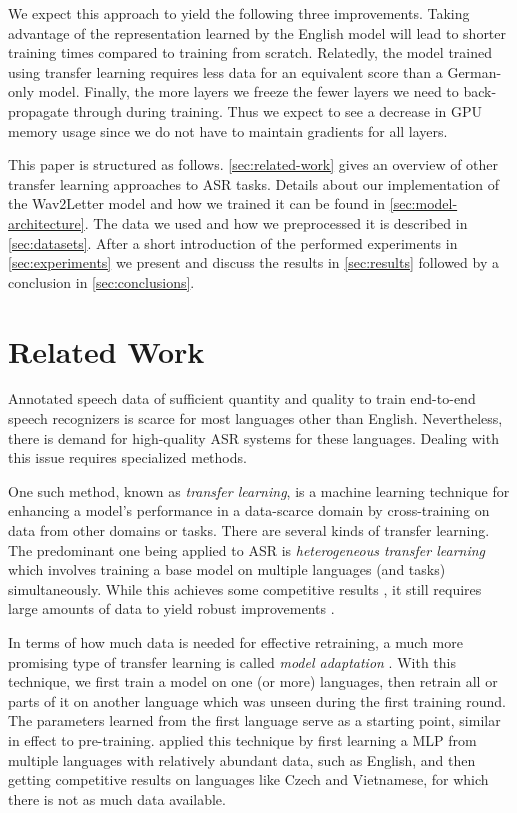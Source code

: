 \documentclass[11pt,a4paper]{article}
\begin{document}
We expect this approach to yield the following three improvements.
Taking advantage of the representation learned by the English model will lead to shorter training times compared to training from scratch.
Relatedly, the model trained using transfer learning requires less data for an equivalent score than a German-only model.
Finally, the more layers we freeze the fewer layers we need to back-propagate through during training.
Thus we expect to see a decrease in GPU memory usage since we do not have to maintain gradients for all layers.

This paper is structured as follows.
\autoref{sec:related-work} gives an overview of other transfer learning approaches to \ac{ASR} tasks.
Details about our implementation of the Wav2Letter model and how we trained it can be found in \autoref{sec:model-architecture}.
The data we used and how we preprocessed it is described in \autoref{sec:datasets}.
After a short introduction of the performed experiments in \autoref{sec:experiments} we present and discuss the results in \autoref{sec:results} followed by a conclusion in \autoref{sec:conclusions}.



\section{Related Work}\label{sec:related-work}

Annotated speech data of sufficient quantity and quality to train end-to-end speech recognizers is scarce for most languages other than English.
Nevertheless, there is demand for high-quality ASR systems for these languages.
Dealing with this issue requires specialized methods.

One such method, known as \emph{transfer learning}, is a machine learning technique for enhancing a model's performance in a data-scarce domain by cross-training on data from other domains or tasks.
There are several kinds of transfer learning.
The predominant one being applied to \ac{ASR} is \emph{heterogeneous transfer learning} \cite{wang_transfer_2015} which involves training a base model on multiple languages (and tasks) simultaneously.
While this achieves some competitive results \cite{chen_mak_2015,knill_gales_2014}, it still requires large amounts of data to yield robust improvements \cite{heigold_multilingual_2013}.

In terms of how much data is needed for effective retraining, a much more promising type of transfer learning is called \emph{model adaptation} \cite{wang_transfer_2015}.
With this technique, we first train a model on one (or more) languages, then retrain all or parts of it on another language which was unseen during the first training round.
The parameters learned from the first language serve as a starting point, similar in effect to pre-training.
\citet{conf/interspeech/VuS13} applied this technique by first learning a \ac{MLP} from multiple languages with relatively abundant data, such as English, and then getting competitive results on languages like Czech and Vietnamese, for which there is not as much data available.
\end{document}
